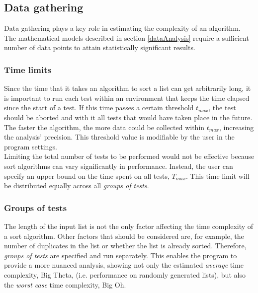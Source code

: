 \documentclass{article}
\begin{document}
        \subsection{Data gathering}
            Data gathering plays a key role in estimating the complexity of an algorithm. The mathematical models described in section \ref{dataAnalysis} require a sufficient number of data points to attain statistically significant results.
            
            \subsubsection{Time limits}
                Since the time that it takes an algorithm to sort a list can get arbitrarily long, it is important to run each test within an environment that keeps the time elapsed since the start of a test. If this time passes a certain threshold $t_{max}$, the test should be aborted and with it all tests that would have taken place in the future. The faster the algorithm, the more data could be collected within $t_{max}$, increasing the analysis' precision. This threshold value is modifiable by the user in the program settings.\\
                
                Limiting the total number of tests to be performed would not be effective because sort algorithms can vary significantly in performance. Instead, the user can specify an upper bound on the time spent on all tests, $T_{max}$. This time limit will be distributed equally across all \textit{groups of tests}.\\
            
            \subsubsection{Groups of tests} \label{testingDataSets}
                The length of the input list is not the only factor affecting the time complexity of a sort algorithm. Other factors that should be considered are, for example, the number of duplicates in the list or whether the list is already sorted. Therefore, \textit{groups of tests} are specified and run separately. This enables the program to provide a more nuanced analysis, showing not only the estimated \textit{average} time complexity, Big Theta, (i.e. performance on randomly generated lists), but also the \textit{worst case} time complexity, Big Oh.\\
                
\end{document}
